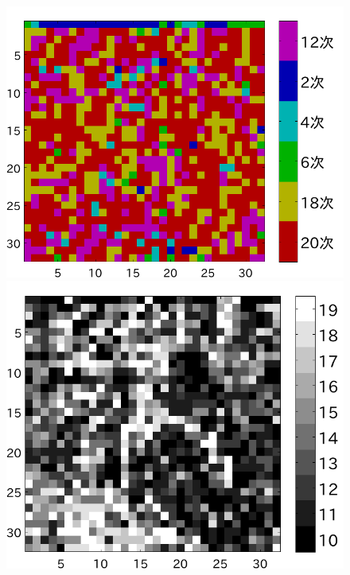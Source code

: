 \documentclass[25pt, landscape,dvipdfmx]{foils}
\begin{document}
\begin{figure}[b]
\begin{flushleft}
\vspace{-1cm}
\includegraphics[angle=-90,scale=0.75]{fig/test1/b16/yosokusikino.pdf}
\includegraphics[angle=-90,scale=0.75]{fig/test1/b16/yosokusikihaba.pdf}

\end{flushleft}
\end{figure}
\end{document}
